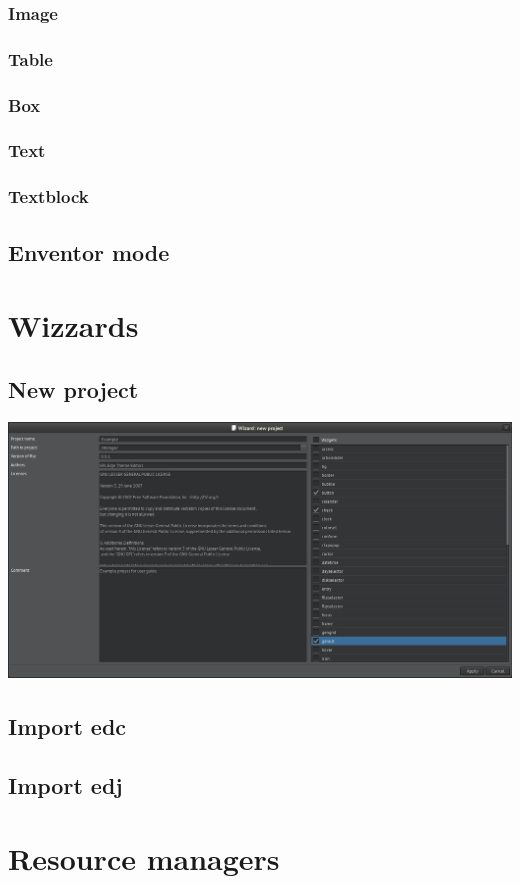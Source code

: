 \documentclass[titlepage,oneside,11pt]{book}
\begin{document}
\subsubsection{Image}
\subsubsection{Table}
\subsubsection{Box}
\subsubsection{Text}
\subsubsection{Textblock}
\subsection{Enventor mode}
\section{Wizzards}
\subsection{New project}
\includegraphics[scale=0.2]{images/wizzard_new_project.png}\newline
\subsection{Import edc}
\subsection{Import edj}
\section{Resource managers}
\end{document}
